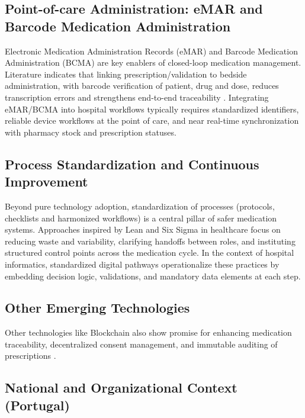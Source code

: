 \subsection{Point-of-care Administration: eMAR and Barcode Medication Administration}
\label{sec:emar_bcma}

Electronic Medication Administration Records (eMAR) and Barcode Medication Administration (BCMA) are key enablers of closed-loop medication management. Literature indicates that linking prescription/validation to bedside administration, with barcode verification of patient, drug and dose, reduces transcription errors and strengthens end-to-end traceability \cite{kallio2020, ciapponi2021}. Integrating eMAR/BCMA into hospital workflows typically requires standardized identifiers, reliable device workflows at the point of care, and near real-time synchronization with pharmacy stock and prescription statuses.

\subsection{Process Standardization and Continuous Improvement}
\label{sec:process_standardization}

Beyond pure technology adoption, standardization of processes (protocols, checklists and harmonized workflows) is a central pillar of safer medication systems. Approaches inspired by Lean and Six Sigma in healthcare focus on reducing waste and variability, clarifying handoffs between roles, and instituting structured control points across the medication cycle. In the context of hospital informatics, standardized digital pathways operationalize these practices by embedding decision logic, validations, and mandatory data elements at each step.

\subsection{Other Emerging Technologies}

Other technologies like Blockchain also show promise for enhancing medication traceability, decentralized consent management, and immutable auditing of prescriptions \cite{franzoso2014}.

\subsection{National and Organizational Context (Portugal)}
\label{sec:national_context_portugal}

